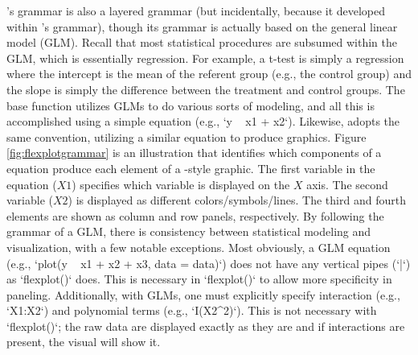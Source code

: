 's grammar is also a layered grammar (but incidentally, because it developed within 's grammar), though its grammar is actually based on the general linear model (GLM). Recall that most statistical procedures are subsumed within the GLM, which is essentially regression. For example, a t-test is simply a regression where the intercept is the mean of the referent group (e.g., the control group) and the slope is simply the difference between the treatment and control groups. The base  function  utilizes GLMs to do various sorts of modeling, and all this is accomplished using a simple equation (e.g., `y ~ x1 + x2`). Likewise,  adopts the same convention, utilizing a similar equation to produce graphics. Figure \ref{fig:flexplotgrammar} is an illustration that identifies which components of a  equation produce each element of a -style graphic. The first variable in the equation ($X1$) specifies which variable is displayed on the $X$ axis. The second variable ($X2$) is displayed as different colors/symbols/lines. The third and fourth elements are shown as column and row panels, respectively. By following the grammar of a GLM, there is consistency between statistical modeling and visualization, with a few notable exceptions. Most obviously, a GLM equation (e.g., `plot(y ~ x1 + x2 + x3, data = data)`) does not have any vertical pipes (`|`) as `flexplot()` does. This is necessary in `flexplot()` to allow more specificity in paneling. Additionally, with GLMs, one must explicitly specify interaction (e.g., `X1:X2`) and polynomial terms (e.g., `I(X2^2)`). This is not necessary with `flexplot()`; the raw data are displayed exactly as they are and if interactions are present, the visual will show it. 


